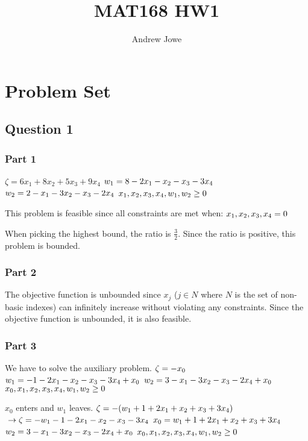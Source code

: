 \documentclass[17pt]{extarticle}
\title{MAT168 HW1}
\author{Andrew Jowe}
\begin{document}
\maketitle
\section*{Problem Set}
\subsection*{Question 1}
\subsubsection*{Part 1}
$\zeta = 6x_1 + 8x_2 + 5x_3 + 9x_4$
$\\ w_1 = 8 - 2x_1 - x_2 - x_3 - 3x_4$
$\\ w_2 = 2 - x_1 - 3x_2 - x_3 - 2x_4$
$\\ x_1, x_2, x_3, x_4, w_1, w_2 \geq 0$

\bigskip This problem is feasible since all constraints are met when:
$\\x_1, x_2, x_3, x_4 = 0$

When picking the highest bound, the ratio is $\frac{3}{2}$. Since the ratio is positive, this problem is bounded.

\subsubsection*{Part 2}
The objective function is unbounded since $x_j$ ($j \in N$ where $N$ is the set of non-basic indexes) can infinitely increase without violating any constraints. Since the objective function is unbounded, it is also feasible.

\subsubsection*{Part 3}
We have to solve the auxiliary problem.
$\\\zeta = -x_0$
$\\ w_1 = - 1 - 2x_1 - x_2 - x_3 - 3x_4 + x_0$
$\\ w_2 = 3 - x_1 - 3x_2 - x_3 - 2x_4 + x_0$
$\\ x_0, x_1, x_2, x_3, x_4, w_1, w_2 \geq 0$

$x_0$ enters and $w_1$ leaves.
$\\\zeta = -(w_1 + 1 + 2x_1 + x_2 + x_3 + 3x_4)$
$\\\to \zeta = -w_1 - 1 - 2x_1 - x_2 - x_3 - 3x_4$
$\\ x_0 = w_1 + 1 + 2x_1 + x_2 + x_3 + 3x_4$
$\\ w_2 = 3 - x_1 - 3x_2 - x_3 - 2x_4 + x_0$
$\\ x_0, x_1, x_2, x_3, x_4, w_1, w_2 \geq 0$
\end{document}
